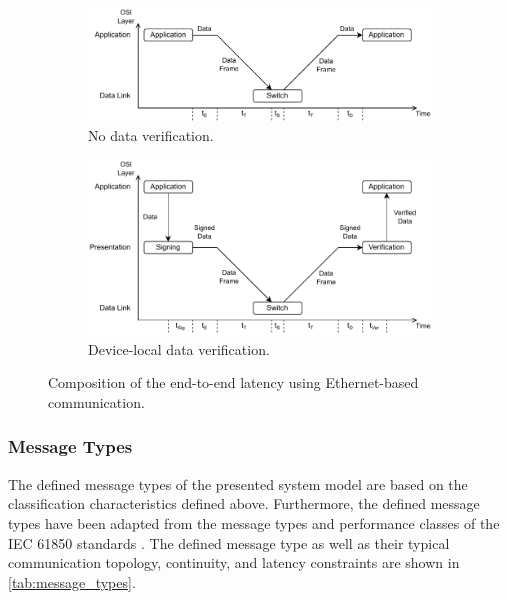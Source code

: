 \begin{figure}
    \centering
    \begin{subfigure}[t]{0.48\linewidth}
        \centering
        \includegraphics[width=\linewidth]{figures/frame_delivery_time_without_signature.drawio.pdf}
        \caption{No data verification.}
        \label{fig:frame_delivery_time_composition:unverified}
    \end{subfigure}
    \hfill
    \begin{subfigure}[t]{0.48\linewidth}
        \centering
        \includegraphics[width=\linewidth]{figures/frame_delivery_time_with_signature.drawio.pdf}
        \caption{Device-local data verification.}
        \label{fig:frame_delivery_time_composition:verified}
    \end{subfigure}
    \caption{Composition of the end-to-end latency using Ethernet-based communication.}
    \label{fig:frame_delivery_time_composition}
\end{figure}

\subsubsection{Message Types}
\label{sec:approach:system_model:communication:message_types}
The defined message types of the presented system model are based on the classification characteristics defined above.
Furthermore, the defined message types have been adapted from the message types and performance classes of the IEC 61850 standards \cite{IEC61850P5}.
The defined message type as well as their typical communication topology, continuity, and latency constraints are shown in \autoref{tab:message_types}.

